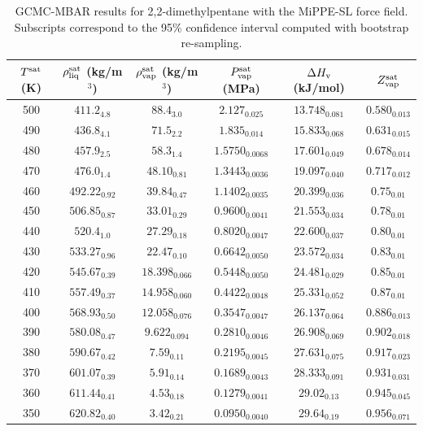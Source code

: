 \documentclass[journal=jctc,manuscript=article]{achemso}
\begin{document}
\begin{table}[htb!]
	\caption{GCMC-MBAR results for 2,2-dimethylpentane with the MiPPE-SL force field. Subscripts correspond to the 95\% confidence interval computed with bootstrap re-sampling.}
	\begin{center}
		\begin{tabular}{|c|c|c|c|c|c|}
			\hline
			$T^{\rm sat}$ (K) & $\rho_{\rm liq}^{\rm sat}$ (kg/m$^3$) & $\rho_{\rm vap}^{\rm sat}$ (kg/m$^3$) & $P_{\rm vap}^{\rm sat}$ (MPa) & $\Delta H_{\rm v}$ (kJ/mol) & $Z_{\rm vap}^{\rm sat}$ \\ \hline
			500 & $411.2_{4.8}$ & $88.4_{3.0}$ & $2.127_{0.025}$ & $13.748_{0.081}$ & $0.580_{0.013}$ \\
			490 & $436.8_{4.1}$ & $71.5_{2.2}$ & $1.835_{0.014}$ & $15.833_{0.068}$ & $0.631_{0.015}$ \\
			480 & $457.9_{2.5}$ & $58.3_{1.4}$ & $1.5750_{0.0068}$ & $17.601_{0.049}$ & $0.678_{0.014}$ \\
			470 & $476.0_{1.4}$ & $48.10_{0.81}$ & $1.3443_{0.0036}$ & $19.097_{0.040}$ & $0.717_{0.012}$ \\
			460 & $492.22_{0.92}$ & $39.84_{0.47}$ & $1.1402_{0.0035}$ & $20.399_{0.036}$ & $0.75_{0.01}$ \\
			450 & $506.85_{0.87}$ & $33.01_{0.29}$ & $0.9600_{0.0041}$ & $21.553_{0.034}$ & $0.78_{0.01}$ \\
			440 & $520.4_{1.0}$ & $27.29_{0.18}$ & $0.8020_{0.0047}$ & $22.600_{0.037}$ & $0.80_{0.01}$ \\
			430 & $533.27_{0.96}$ & $22.47_{0.10}$ & $0.6642_{0.0050}$ & $23.572_{0.034}$ & $0.83_{0.01}$ \\
			420 & $545.67_{0.39}$ & $18.398_{0.066}$ & $0.5448_{0.0050}$ & $24.481_{0.029}$ & $0.85_{0.01}$ \\
			410 & $557.49_{0.37}$ & $14.958_{0.060}$ & $0.4422_{0.0048}$ & $25.331_{0.052}$ & $0.87_{0.01}$ \\
			400 & $568.93_{0.50}$ & $12.058_{0.076}$ & $0.3547_{0.0047}$ & $26.137_{0.064}$ & $0.886_{0.013}$ \\
			390 & $580.08_{0.47}$ & $9.622_{0.094}$ & $0.2810_{0.0046}$ & $26.908_{0.069}$ & $0.902_{0.018}$ \\
			380 & $590.67_{0.42}$ & $7.59_{0.11}$ & $0.2195_{0.0045}$ & $27.631_{0.075}$ & $0.917_{0.023}$ \\
			370 & $601.07_{0.39}$ & $5.91_{0.14}$ & $0.1689_{0.0043}$ & $28.333_{0.091}$ & $0.931_{0.031}$ \\
			360 & $611.44_{0.41}$ & $4.53_{0.18}$ & $0.1279_{0.0041}$ & $29.02_{0.13}$ & $0.945_{0.045}$ \\
			350 & $620.82_{0.40}$ & $3.42_{0.21}$ & $0.0950_{0.0040}$ & $29.64_{0.19}$ & $0.956_{0.071}$ \\
			\hline
		\end{tabular}
	\end{center}
\end{table}
\end{document}
